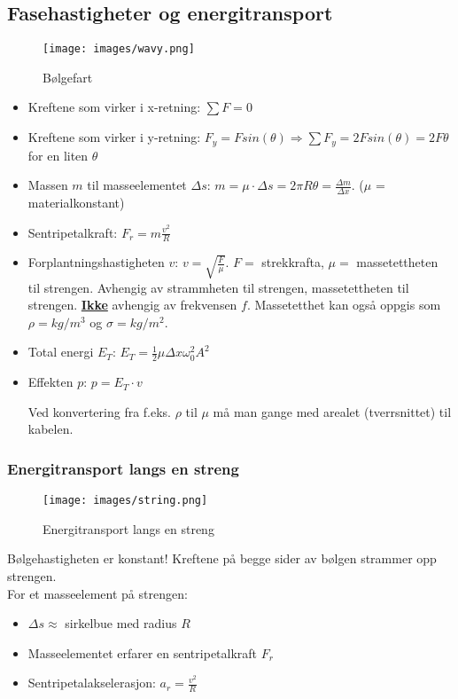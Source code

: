\documentclass[12pt]{article}
\begin{document}
\subsection{Fasehastigheter og energitransport}
\begin{figure} [H]
    \centering
    \texttt{[image: images/wavy.png]}
    \caption{Bølgefart}
\end{figure}
\begin{itemize}
    \item[] Kreftene som virker i x-retning: $\sum F = 0$
    \item[] Kreftene som virker i y-retning: $F_y = Fsin(\theta) \Rightarrow \sum F_y = 2Fsin(\theta) = 2F\theta$ for en liten $\theta$
    \item[] Massen $m$ til masseelementet $\Delta s$: $m = \mu \cdot \Delta s = 2\pi R\theta = \frac{\Delta m}{\Delta x}$. ($\mu$ = materialkonstant)
    \item[] Sentripetalkraft: $F_r = m \frac{v^2}{R}$
    \item[] Forplantningshastigheten $v$: $v = \sqrt{\frac{F}{\mu}}$. $F =$ strekkrafta, $\mu =$ massetettheten til strengen. Avhengig av strammheten til strengen, massetettheten til strengen. \underline{\textbf{Ikke}} avhengig av frekvensen $f$.  Massetetthet kan også oppgis som $\rho = kg/m^3 $ og $\sigma = kg/m^2 $.
    \item[] Total energi $E_T$: $E_T = \frac{1}{2}\mu\Delta x \omega_0^2A^2$
    \item[] Effekten $p$: $p = E_T \cdot v$

Ved konvertering fra f.eks. $\rho$ til $\mu$ må man gange med arealet (tverrsnittet) til kabelen.
\end{itemize}
\subsubsection{Energitransport langs en streng}
\begin{figure} [H]
    \centering
    \texttt{[image: images/string.png]}
    \caption{Energitransport langs en streng}
\end{figure}

Bølgehastigheten er konstant! Kreftene på begge sider av bølgen strammer opp strengen.\\
For et masseelement på strengen:
\begin{itemize}
    \item[] $\Delta s \approx$ sirkelbue med radius $R$
    \item[] Masseelementet erfarer en sentripetalkraft $F_r$
    \item[] Sentripetalakselerasjon: $a_r = \frac{v^2}{R}$
\end{itemize}
\end{document}
